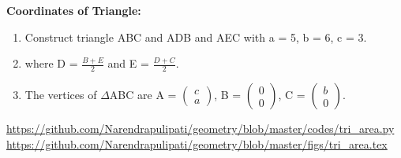 \begin{frame}{}
\begin{figure}[!ht]
	\begin{center}
		\resizebox{0.8\columnwidth}{!}{}
	\end{center}
	\caption{}
	\label{}	
\end{figure}
\end{frame}
\begin{frame}
\textbf{Coordinates of  Triangle:}
\begin{enumerate}
\item Construct triangle ABC and ADB and AEC with a = 5, b = 6, c = 3.
\item where D = $\frac{B+E}{2}$ and E = $\frac{D+C}{2}$.
\item The vertices of $\Delta$ABC are A = $\begin{pmatrix} c\\a \end{pmatrix}$, B = $\begin{pmatrix} 0\\0 \end{pmatrix}$, C = $\begin{pmatrix} b\\0 \end{pmatrix}.$ 
\end{enumerate}
\url{https://github.com/Narendrapulipati/geometry/blob/master/codes/tri_area.py}
\url{https://github.com/Narendrapulipati/geometry/blob/master/figs/tri_area.tex}
\end{frame}